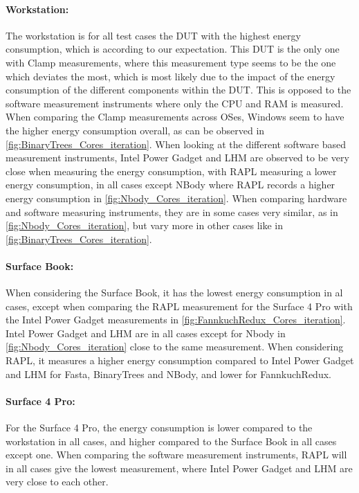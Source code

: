 \paragraph{Workstation:} The workstation is for all test cases the DUT with the highest energy consumption, which is according to our expectation. This DUT is the only one with Clamp measurements, where this measurement type seems to be the one which deviates the most, which is most likely due to the impact of the energy consumption of the different components within the DUT. This is opposed to the software measurement instruments where only the CPU and RAM is measured. When comparing the Clamp measurements across OSes, Windows seem to have the higher energy consumption overall, as can be observed in \cref{fig:BinaryTrees_Cores_iteration}. When looking at the different software based measurement instruments, Intel Power Gadget and LHM are observed to be very close when measuring the energy consumption, with RAPL measuring a lower energy consumption, in all cases except NBody where RAPL records a higher energy consumption in \cref{fig:Nbody_Cores_iteration}. When comparing hardware and software measuring instruments, they are in some cases very similar, as in \cref{fig:Nbody_Cores_iteration}, but vary more in other cases like in \cref{fig:BinaryTrees_Cores_iteration}.

\paragraph{Surface Book:} When considering the Surface Book, it has the lowest energy consumption in al cases, except when comparing the RAPL measurement for the Surface 4 Pro with the Intel Power Gadget measurements in \cref{fig:FannkuchRedux_Cores_iteration}. Intel Power Gadget and LHM are in all cases except for Nbody in \cref{fig:Nbody_Cores_iteration} close to the same measurement. When considering RAPL, it measures a higher energy consumption compared to Intel Power Gadget and LHM for Fasta, BinaryTrees and NBody, and lower for FannkuchRedux.

\paragraph{Surface 4 Pro:} For the Surface 4 Pro, the energy consumption is lower compared to the workstation in all cases, and higher compared to the Surface Book in all cases except one. When comparing the software measurement instruments, RAPL will in all cases give the lowest measurement, where Intel Power Gadget and LHM are very close to each other.



